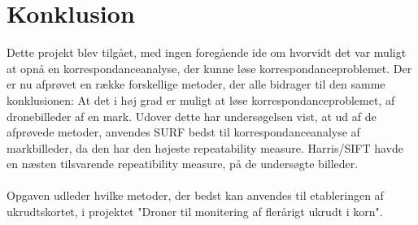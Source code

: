 \chapter{Konklusion}
Dette projekt blev tilgået, med ingen foregående ide om hvorvidt det var muligt at opnå en korrespondanceanalyse, der kunne løse korrespondanceproblemet. Der er nu afprøvet en række forskellige metoder, der alle bidrager til den samme konklusionen: At det i høj grad er muligt at løse korrespondanceproblemet, af dronebilleder af en mark. Udover dette har undersøgelsen vist, at ud af de afprøvede metoder, anvendes SURF bedst til korrespondanceanalyse af markbilleder, da den har den højeste repeatability measure. Harris/SIFT havde en næsten tilsvarende repeatibility measure, på de undersøgte billeder.\\ \\
Opgaven udleder hvilke metoder, der bedst kan anvendes til etableringen af ukrudtskortet, i projektet "Droner til monitering af flerårigt ukrudt i korn".